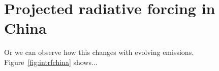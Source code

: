 \section{Projected radiative forcing in China}



Or we can observe how this changes with evolving emissions. Figure~\ref{fig:intrfchina} shows...